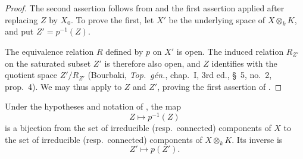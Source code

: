 \begin{proof}
The second assertion follows from  and the first assertion
applied after replacing $Z$ by $X_0$.
To prove the first, let $X'$ be the underlying space of
$X\otimes_k K$, and put $Z'=p^{-1}(Z)$.


The equivalence relation $R$ defined by $p$ on $X'$ is open.
The induced relation $R_{Z'}$ on the saturated subset $Z'$ is therefore
also open, and $Z$ identifies with the quotient space $Z'/R_{Z'}$
(Bourbaki, \emph{Top.\ g\'en.}, chap.~I, 3rd ed., \S~5, no.~2,
prop.~4).
We may thus apply  to $Z$ and $Z'$, proving the first
assertion of .
\end{proof}

\begin{corollary}[4.4.6]
\label{IV.4.4.6}
Under the hypotheses and notation of , the map
\[
Z\longmapsto p^{-1}(Z)
\]
is a bijection from the set of irreducible (resp.\ connected)
components of $X$ to the set of irreducible (resp.\ connected)
components of $X\otimes_k K$.
Its inverse is
\[
Z'\longmapsto p(Z').
\]
\end{corollary}
